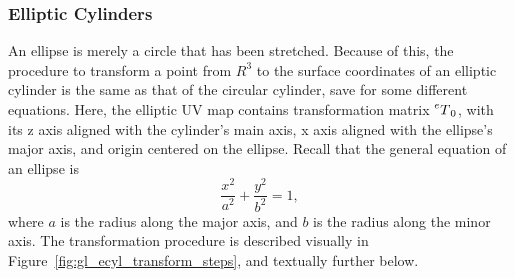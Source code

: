 \subsubsection{Elliptic Cylinders}
An ellipse is merely a circle that has been stretched.
Because of this, the procedure to transform a point from $R^3$ to the surface coordinates of an elliptic cylinder is the same as that of the circular cylinder, save for some different equations.
Here, the elliptic UV map contains transformation matrix $\prescript{e}{}T_0$, with its z axis aligned with the cylinder's main axis, x axis aligned with the ellipse's major axis, and origin centered on the ellipse.
Recall that the general equation of an ellipse is
\begin{equation*}
	\frac{x^2}{a^2} + \frac{y^2}{b^2} = 1,
\end{equation*}
where $a$ is the radius along the major axis, and $b$ is the radius along the minor axis.
The transformation procedure is described visually in Figure~\ref{fig:gl_ecyl_transform_steps}, and textually further below.

